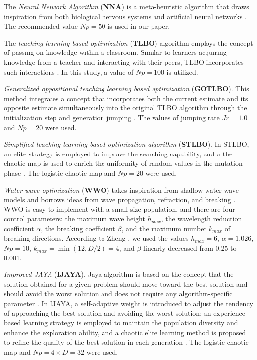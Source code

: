 \documentclass[a4paper,fleqn]{cas-dc}
\begin{document}
The \emph{Neural Network Algorithm} (\textbf{NNA}) is a meta-heuristic algorithm that draws inspiration from
both biological nervous systems and artificial neural networks \cite{NNA}.
The recommended \cite{NNA} value $N\!p=50$ is used in our paper.

The \emph{teaching learning based optimization} (\textbf{TLBO}) algorithm employs the concept of passing on knowledge
within a classroom.
Similar to learners acquiring knowledge from a teacher and interacting with their peers,
TLBO incorporates such interactions \cite{TLBO_Patel}.
In this study, a value of $N\!p=100$ is utilized.

\emph{Generalized oppositional teaching learning based optimization} (\textbf{GOTLBO}).
This method integrates a concept that incorporates both the current estimate
and its opposite estimate simultaneously into the original TLBO algorithm
through the initialization step and generation jumping \cite{GOTLBO}.
The values of jumping rate $J\!r=1.0$ and $N\!p=20$ were used.

\emph{Simplified teaching-learning based optimization algorithm} (\textbf{STLBO}).
In STLBO, an elite strategy is employed to improve the searching capability,
and a the chaotic map is used to enrich the uniformity of random values in the mutation phase \cite{STLBO}.
The logistic chaotic map and $N\!p=20$ were used.


\emph{Water wave optimization} (\textbf{WWO}) takes inspiration from shallow water wave models
and borrows ideas from wave propagation, refraction, and breaking \cite{WW}.
WWO is easy to implement with a small-size population, and there are four control parameters:
the maximum wave height $h_{max}$,
the wavelength reduction coefficient $\alpha$,
the breaking coefficient $\beta$,
and the maximum number $k_{max}$ of breaking directions.
According to Zheng \cite{WW}, we used
the values $h_{max}=6$, $\alpha=1.026$,  $N\!p=10$,
$k_{max}=\min(12,D/2)=4$, and $\beta$ linearly decreased from 0.25 to 0.001.

\emph{Improved JAYA} (\textbf{IJAYA}).
Jaya algorithm is based on the concept
that the solution obtained for a given problem should move toward the best solution and should
avoid the worst solution and does not require any algorithm-specific parameter \cite{JAYA}.
In IJAYA, a self-adaptive weight is introduced to adjust the tendency of approaching the best solution
and avoiding the worst solution;
an experience-based learning strategy is employed to maintain the population diversity and enhance the exploration ability,
and a chaotic elite learning method is proposed to refine the quality of the best solution in each generation \cite{IJAYA}.
The logistic chaotic map and $N\!p=4\times D=32$ were used.
\end{document}

